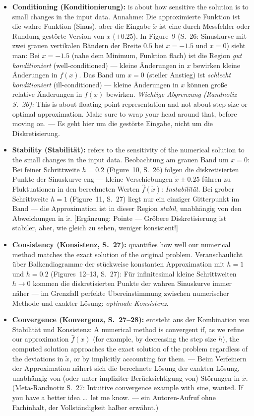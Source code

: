 \begin{itemize}
  \item \textbf{Conditioning (Konditionierung):} \glqq is about how sensitive the solution is to small changes in the input data.\grqq{} Annahme: Die approximierte Funktion ist die wahre Funktion (Sinus), aber die Eingabe $\tilde{x}$ ist eine durch Messfehler oder Rundung gestörte Version von $x$ ($\pm 0.25$). In Figure~9 (S.~26: Sinuskurve mit zwei grauen vertikalen Bändern der Breite $0.5$ bei $x=-1.5$ und $x=0$) sieht man: Bei $x=-1.5$ (nahe dem Minimum, Funktion flach) ist die Region \emph{gut konditioniert} (well-conditioned) — kleine Änderungen in $x$ bewirken kleine Änderungen in $f(x)$. Das Band um $x=0$ (steiler Anstieg) ist \emph{schlecht konditioniert} (ill-conditioned) — kleine Änderungen in $x$ können große relative Änderungen in $f(x)$ bewirken. \emph{Wichtige Abgrenzung (Randnotiz S.~26):} \glqq This is about floating-point representation and not about step size or optimal approximation. Make sure to wrap your head around that, before moving on.\grqq{} — Es geht hier um die gestörte Eingabe, nicht um die Diskretisierung.
  \item \textbf{Stability (Stabilität):} \glqq refers to the sensitivity of the numerical solution to the small changes in the input data.\grqq{} Beobachtung am grauen Band um $x=0$: Bei feiner Schrittweite $h=0.2$ (Figure~10, S.~26) folgen die diskretisierten Punkte der Sinuskurve eng — kleine Verschiebungen $\tilde{x}\pm 0.25$ führen zu Fluktuationen in den berechneten Werten $\hat{f}(\tilde{x})$: \emph{Instabilität}. Bei grober Schrittweite $h=1$ (Figure~11, S.~27) liegt nur ein einziger Gitterpunkt im Band — die Approximation ist in dieser Region \emph{stabil}, unabhängig von den Abweichungen in $\tilde{x}$. [Ergänzung: Pointe — Gröbere Diskretisierung ist stabiler, aber, wie gleich zu sehen, weniger konsistent!]
  \item \textbf{Consistency (Konsistenz, S.~27):} \glqq quantifies how well our numerical method matches the exact solution of the original problem.\grqq{} Veranschaulicht über Balkendiagramme der stückweise konstanten Approximation mit $h=1$ und $h=0.2$ (Figures~12--13, S.~27): Für infinitesimal kleine Schrittweiten $h \to 0$ kommen die diskretisierten Punkte der wahren Sinuskurve immer näher — im Grenzfall perfekte Übereinstimmung zwischen numerischer Methode und exakter Lösung: \emph{optimale Konsistenz}.
  \item \textbf{Convergence (Konvergenz, S.~27--28):} entsteht aus der Kombination von Stabilität und Konsistenz: \glqq A numerical method is convergent if, as we refine our approximation $\hat{f}(x)$ (for example, by decreasing the step size $h$), the computed solution approaches the exact solution of the problem regardless of the deviations in $\tilde{x}$, or by implicitly accounting for them.\grqq{} — Beim Verfeinern der Approximation nähert sich die berechnete Lösung der exakten Lösung, unabhängig von (oder unter impliziter Berücksichtigung von) Störungen in $\tilde{x}$. (Meta-Randnotiz S.~27: \glqq Intuitive convergence example with sine, wanted. If you have a better idea \ldots\ let me know.\grqq{} — ein Autoren-Aufruf ohne Fachinhalt, der Vollständigkeit halber erwähnt.)
\end{itemize}

